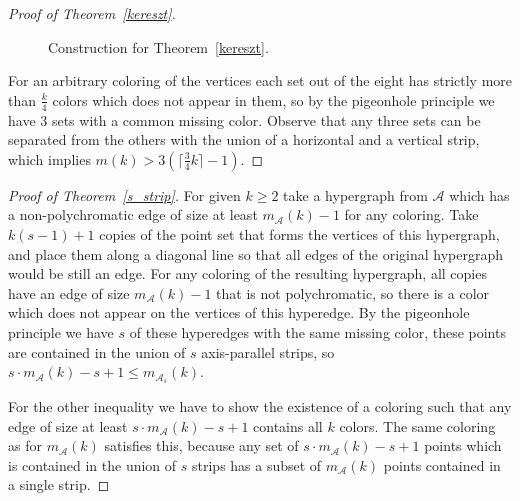 \documentclass[11pt,oneside]{amsart}
\newcommand{\A}{\mathcal{A}}
\begin{document}
\begin{proof}[Proof of Theorem~\ref{kereszt}]
\begin{figure}[h!]
\caption{Construction for Theorem~\ref{kereszt}.}
\label{keresztabra}
\end{figure}

For an arbitrary coloring of the vertices each set out of the eight has strictly more than $\frac{k}{4}$ colors which does not appear in them, so by the pigeonhole principle we have 3 sets with a common missing color. Observe that any three sets can be separated from the others with the union of a horizontal and a vertical strip, which implies $m(k)>3(\lceil \frac{3}{4}k\rceil-1)$.
\end{proof}

\begin{proof}[Proof of Theorem~\ref{s_strip}]

For given $k\ge 2$ take a hypergraph from $\A$ which has a non-poly\-chromatic edge of size at least $m_\A(k)-1$ for any coloring. Take $k(s-1)+1$ copies of the point set that forms the vertices of this hypergraph, and place them along a diagonal line so that all edges of the original hypergraph would be still an edge. For any coloring of the resulting hypergraph, all copies have an edge of size $m_\A(k)-1$ that is not polychromatic, so there is a color which does not appear on the vertices of this hyperedge. By the pigeonhole principle we have $s$ of these hyperedges with the same missing color, these points are contained in the union of $s$ axis-parallel strips, so $s \cdot m_\A(k) -s + 1 \le m_{\A_s}(k)$.

For the other inequality we have to show the existence of a coloring such that any edge of size at least $s \cdot m_\A(k) -s + 1$ contains all $k$ colors. The same coloring as for $m_\A(k)$ satisfies this, because any set of $s \cdot m_\A(k) -s + 1$ points which is contained in the union of $s$ strips has a subset of $m_\A(k)$ points contained in a single strip.
\end{proof}
\end{document}
